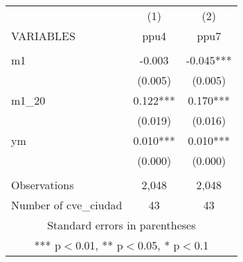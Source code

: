 \begin{tabular}{lcc} \hline
 & (1) & (2) \\
VARIABLES & ppu4 & ppu7 \\ \hline
 &  &  \\
m1 & -0.003 & -0.045*** \\
 & (0.005) & (0.005) \\
m1\_20 & 0.122*** & 0.170*** \\
 & (0.019) & (0.016) \\
ym & 0.010*** & 0.010*** \\
 & (0.000) & (0.000) \\
 &  &  \\
Observations & 2,048 & 2,048 \\
 Number of cve\_ciudad & 43 & 43 \\ \hline
\multicolumn{3}{c}{ Standard errors in parentheses} \\
\multicolumn{3}{c}{ *** p$<$0.01, ** p$<$0.05, * p$<$0.1} \\
\end{tabular}
